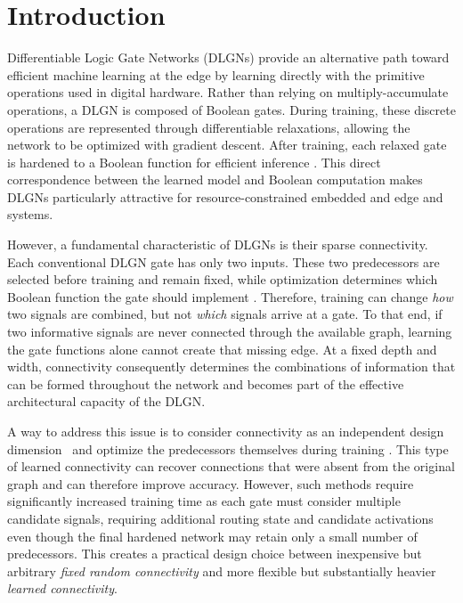 \section{Introduction}

Differentiable Logic Gate Networks (DLGNs) provide an alternative path toward
efficient machine learning at the edge by learning directly with the primitive operations
used in digital hardware. Rather than relying on multiply-accumulate
operations, a DLGN is composed of Boolean gates. During training, these discrete operations are
represented through differentiable relaxations, allowing the network to be
optimized with gradient descent. After training, each relaxed gate is hardened
to a Boolean function for efficient inference \cite{petersen2022}. This direct
correspondence between the learned model and Boolean computation makes DLGNs
particularly attractive for resource-constrained embedded and edge and systems.

However, a fundamental characteristic of DLGNs is their sparse
connectivity. Each conventional DLGN gate has only two inputs. These two predecessors are selected before training and remain
fixed, while optimization determines which Boolean function the gate should
implement \cite{petersen2022}. Therefore, training can change \emph{how} two
signals are combined, but not \emph{which} signals arrive at a gate. To that end,  if two
informative signals are never connected through the available graph, learning
the gate functions alone cannot create that missing edge. At a fixed depth and
width, connectivity consequently determines the combinations of information
that can be formed throughout the network and becomes part of the effective
architectural capacity of the DLGN.

A way to address this issue is to consider connectivity as an independent
design dimension~\cite{buehrer2026} and optimize the predecessors themselves during
training \cite{mommen2025,fojcik2026}. This type of learned connectivity can recover
connections that were absent from the original graph and can therefore improve
accuracy. However, such methods require significantly increased training time as each gate must consider multiple candidate signals,
requiring additional routing state and candidate activations even though the
final hardened network may retain only a small number of predecessors. This
creates a practical design choice between inexpensive but arbitrary
\emph{fixed random connectivity} and more flexible but substantially heavier
\emph{learned connectivity}.


